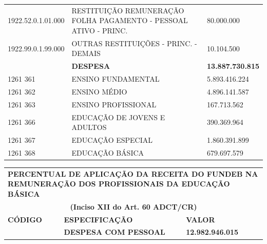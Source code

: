 \documentclass{article}
\begin{document}
\begin{longtable}[c]{m{2.5cm}|m{14cm}|m{1.5cm}}
\multicolumn{1}{L{2.5cm}|}{1922.52.0.1.01.000} & \multicolumn{1}{L{14cm}|}{RESTITUIÇÃO REMUNERAÇÃO FOLHA PAGAMENTO - PESSOAL ATIVO - PRINC.} & \multicolumn{1}{R{1.5cm}}{80.000.000} \\
\multicolumn{1}{L{2.5cm}|}{1922.99.0.1.99.000} & \multicolumn{1}{L{14cm}|}{OUTRAS RESTITUIÇÕES - PRINC. - DEMAIS} & \multicolumn{1}{R{1.5cm}}{10.104.500} \\
\hline
\multicolumn{1}{L{2.5cm}|}{ \textbf{}} & \multicolumn{1}{L{14cm}|}{ \textbf{DESPESA}} & \multicolumn{1}{R{1.5cm}}{ \textbf{13.887.730.815}} \\
\multicolumn{1}{L{2.5cm}|}{1261 361} & \multicolumn{1}{L{14cm}|}{ENSINO FUNDAMENTAL} & \multicolumn{1}{R{1.5cm}}{5.893.416.224} \\
\multicolumn{1}{L{2.5cm}|}{1261 362} & \multicolumn{1}{L{14cm}|}{ENSINO MÉDIO} & \multicolumn{1}{R{1.5cm}}{4.896.141.587} \\
\multicolumn{1}{L{2.5cm}|}{1261 363} & \multicolumn{1}{L{14cm}|}{ENSINO PROFISSIONAL} & \multicolumn{1}{R{1.5cm}}{167.713.562} \\
\multicolumn{1}{L{2.5cm}|}{1261 366} & \multicolumn{1}{L{14cm}|}{EDUCAÇÃO DE JOVENS E ADULTOS} & \multicolumn{1}{R{1.5cm}}{390.369.964} \\
\multicolumn{1}{L{2.5cm}|}{1261 367} & \multicolumn{1}{L{14cm}|}{EDUCAÇÃO ESPECIAL} & \multicolumn{1}{R{1.5cm}}{1.860.391.899} \\
\multicolumn{1}{L{2.5cm}|}{1261 368} & \multicolumn{1}{L{14cm}|}{EDUCAÇÃO BÁSICA} & \multicolumn{1}{R{1.5cm}}{679.697.579} \\\hline\hline\end{longtable}\noindent\begin{longtable}[c]{m{3cm}|m{12cm}|m{3cm}}\multicolumn{3}{C{19cm}}{\cellcolor{gray!50} \textcolor{myblack} {\footnotesize \textbf{PERCENTUAL DE APLICAÇÃO DA RECEITA DO FUNDEB NA REMUNERAÇÃO DOS PROFISSIONAIS \newline DA EDUCAÇÃO BÁSICA}}} \\\multicolumn{3}{c}{\cellcolor{gray!50} \textcolor{myblack} {\footnotesize \textbf{(Inciso XII do Art. 60 ADCT/CR)}}} \\\hline\hline \multicolumn{1}{L{3cm}|}{\textbf{CÓDIGO}} & \multicolumn{1}{C{12cm}|}{ \textbf{ESPECIFICAÇÃO}} & \multicolumn{1}{C{3cm}}{ \textbf{VALOR}} \\\hline\hline \hline\hline
\multicolumn{1}{L{3cm}|}{ \textbf{}} & \multicolumn{1}{L{12cm}|}{ \textbf{DESPESA COM PESSOAL}} & \multicolumn{1}{R{3cm}}{ \textbf{12.982.946.015}} \\

\end{longtable}
\end{document}
